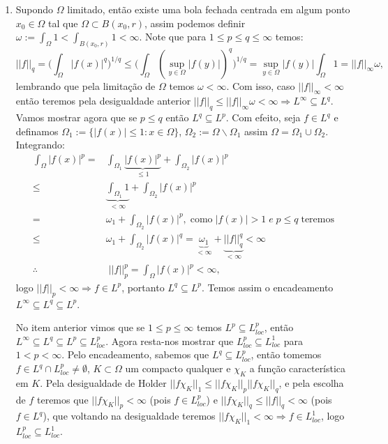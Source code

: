 \documentclass{article}
\begin{document}
\begin{enumerate}
\begin{enumerate}
			\item Supondo $\Omega$ limitado, então existe uma bola fechada centrada em algum ponto $x_{0} \in \Omega$ tal que $\Omega \subset B(x_{0}, r)$, assim podemos definir $\omega := \int_{\Omega} 1 < \int_{B(x_0, r)} 1 < \infty$. Note que para $1 \leq p \leq q \leq \infty$ temos:
			$$
			||f||_{q} = \Big( \int_{\Omega} |f(x)|^{q} \Big)^{1/q} \leq \Big( \int_{\Omega} (\sup_{y \in \Omega}|f(y)|)^{q} \Big)^{1/q} = \sup_{y \in \Omega}|f(y)|\int_{\Omega} 1 = ||f||_{\infty}\omega,
			$$
			lembrando que pela limitação de $\Omega$ temos $\omega < \infty$. Com isso, caso $||f||_{\infty} < \infty$ então teremos pela desigualdade anterior $||f||_{q} \leq ||f||_{\infty}\omega < \infty \Rightarrow L^{\infty} \subseteq L^{q}$. Vamos mostrar agora que se $p \leq q$ então $L^{q} \subseteq L^{p}$. Com efeito, seja $f \in L^{q}$ e definamos $\Omega_{1} := \{ |f(x)| \leq 1: x \in \Omega \}$,  $\Omega_{2} := \Omega\backslash\Omega_{1}$ assim $\Omega = \Omega_{1} \cup \Omega_{2}$. Integrando:
			$$
			\begin{aligned}
			\int_{\Omega}|f(x)|^{p}
			= & \int_{\Omega_{1}} \underbrace{|f(x)|^{p}}_{\leq 1} + \int_{\Omega_{2}}|f(x)|^{p} \\
			\leq & \underbrace{ \int_{\Omega_{1}} 1 }_{< \infty}  + \int_{\Omega_{2}}|f(x)|^{p} \\
			= & \omega_{1} + \int_{\Omega_{2}} |f(x)|^{p}, \; \text{como} \; |f(x)|>1 \; e \; p\leq q \; \text{teremos}\\ 
			\leq & \omega_{1} + \int_{\Omega_{2}}|f(x)|^{q} = \underbrace{ \omega_{1} }_{< \infty }+ \underbrace{ ||f||_{q}^{q} }_{< \infty} < \infty \\
			\therefore & \; ||f||_{p}^{p} = \int_{\Omega}|f(x)|^{p} < \infty,
			\end{aligned}
			$$
			logo $||f||_{p} <\infty \Rightarrow f \in L^{p}$, portanto $L^{q} \subseteq L^{p}$. Temos assim o encadeamento $L^{\infty} \subseteq L^{q} \subseteq L^{p}$. 
			
			No item anterior vimos que se $1 \leq p \leq \infty$ temos $L^{p} \subseteq L^{p}_{loc}$, então $L^{\infty} \subseteq L^{q} \subseteq L^{p} \subseteq L^{p}_{loc}$. Agora resta-nos mostrar que $L^{p}_{loc} \subseteq L^{1}_{loc}$ para $1 < p < \infty$. Pelo encadeamento, sabemos que $L^{q}\subseteq L^{p}_{loc}$, então tomemos $f \in L^{q} \cap L^{p}_{loc} \neq \emptyset$, $K \subset \Omega$ um compacto qualquer e $\chi_{K}$ a função característica em $K$. Pela desigualdade de Holder $||f\chi_{K}||_{1} \leq ||f\chi_{K}||_{p}||f\chi_{K}||_{q}$, e pela escolha de $f$ teremos que $||f\chi_{K}||_{p} < \infty$ (pois $f \in L^{p}_{loc}$) e $||f\chi_{K}||_{q} \leq ||f||_{q} < \infty$ (pois $f \in L^{q}$), que voltando na desigualdade teremos $||f\chi_{K}||_{1} < \infty \Rightarrow f \in L^{1}_{loc}$, logo $L^{p}_{loc} \subseteq L^{1}_{loc}$. 
			

\end{enumerate}
\end{enumerate}
\end{document}
